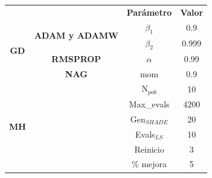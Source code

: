 \begin{table}[!tbp]
\centering
\begin{tabular}{cc|c|c|}
\cline{3-4}
\multicolumn{2}{c|}{}                                                                       & \textbf{Parámetro} & \textbf{Valor} \\ \cline{1-4} 
\multicolumn{1}{|c|}{\multirow{4}{*}{\textbf{GD}}} & \multirow{2}{*}{\textbf{ADAM y ADAMW}} & $\beta_1$          & 0.9            \\ \cline{3-4} 
\multicolumn{1}{|c|}{}                             &                                        & $\beta_2$          & 0.999          \\ \cline{2-4} 
\multicolumn{1}{|c|}{}                             & \textbf{RMSPROP}                       & $\alpha$           & 0.99           \\ \cline{2-4} 
\multicolumn{1}{|c|}{}                             & \textbf{NAG}                           & mom                & 0.9            \\ \hline
\multicolumn{1}{|c}{\multirow{6}{*}{\textbf{MH}}}  & \multirow{6}{*}{}                      & N$_{pob}$          & 10             \\ \cline{3-4} 
\multicolumn{1}{|c}{}                              &                                        & Max\_evals         & 4200           \\ \cline{3-4} 
\multicolumn{1}{|c}{}                              &                                        & Gen$_{SHADE}$    & 20            \\ \cline{3-4} 
\multicolumn{1}{|c}{}                              &                                        & Evals$_{LS}$       & 10             \\ \cline{3-4} 
\multicolumn{1}{|c}{}                              &                                        & Reinicio           & 3              \\ \cline{3-4} 
\multicolumn{1}{|c}{}                              &                                        & \% mejora          & 5              \\ \hline

\end{tabular}
\end{table}
